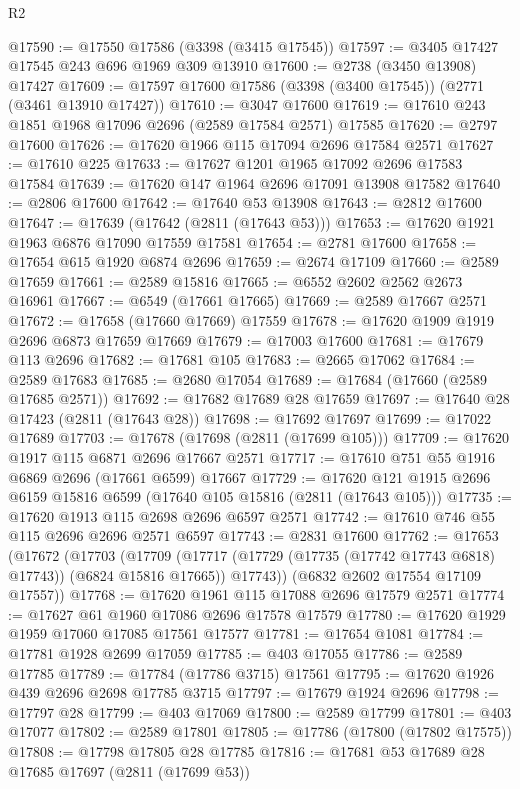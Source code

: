 \begin{lexlean}{R2}
\begin{coremodule}
@17590 := @17550 @17586 (@3398 (@3415 @17545))
@17597 := @3405 @17427 @17545 @243 @696 @1969 @309 @13910
@17600 := @2738 (@3450 @13908) @17427
@17609 := @17597 @17600 @17586 (@3398 (@3400 @17545)) (@2771 (@3461 @13910 @17427))
@17610 := @3047 @17600
@17619 := @17610 @243 @1851 @1968 @17096 @2696 (@2589 @17584 @2571) @17585
@17620 := @2797 @17600
@17626 := @17620 @1966 @115 @17094 @2696 @17584 @2571
@17627 := @17610 @225
@17633 := @17627 @1201 @1965 @17092 @2696 @17583 @17584
@17639 := @17620 @147 @1964 @2696 @17091 @13908 @17582
@17640 := @2806 @17600
@17642 := @17640 @53 @13908
@17643 := @2812 @17600
@17647 := @17639 (@17642 (@2811 (@17643 @53)))
@17653 := @17620 @1921 @1963 @6876 @17090 @17559 @17581
@17654 := @2781 @17600
@17658 := @17654 @615 @1920 @6874 @2696
@17659 := @2674 @17109
@17660 := @2589 @17659
@17661 := @2589 @15816
@17665 := @6552 @2602 @2562 @2673 @16961
@17667 := @6549 (@17661 @17665)
@17669 := @2589 @17667 @2571
@17672 := @17658 (@17660 @17669) @17559
@17678 := @17620 @1909 @1919 @2696 @6873 @17659 @17669
@17679 := @17003 @17600
@17681 := @17679 @113 @2696
@17682 := @17681 @105
@17683 := @2665 @17062
@17684 := @2589 @17683
@17685 := @2680 @17054
@17689 := @17684 (@17660 (@2589 @17685 @2571))
@17692 := @17682 @17689 @28 @17659
@17697 := @17640 @28 @17423 (@2811 (@17643 @28))
@17698 := @17692 @17697
@17699 := @17022 @17689
@17703 := @17678 (@17698 (@2811 (@17699 @105)))
@17709 := @17620 @1917 @115 @6871 @2696 @17667 @2571
@17717 := @17610 @751 @55 @1916 @6869 @2696 (@17661 @6599) @17667
@17729 := @17620 @121 @1915 @2696 @6159 @15816 @6599 (@17640 @105 @15816 (@2811 (@17643 @105)))
@17735 := @17620 @1913 @115 @2698 @2696 @6597 @2571
@17742 := @17610 @746 @55 @115 @2696 @2696 @2571 @6597
@17743 := @2831 @17600
@17762 := @17653
    (@17672
      (@17703
        (@17709
          (@17717 (@17729 (@17735 (@17742 @17743 @6818) @17743)) (@6824 @15816 @17665))
          @17743))
      (@6832 @2602 @17554 @17109 @17557))
@17768 := @17620 @1961 @115 @17088 @2696 @17579 @2571
@17774 := @17627 @61 @1960 @17086 @2696 @17578 @17579
@17780 := @17620 @1929 @1959 @17060 @17085 @17561 @17577
@17781 := @17654 @1081
@17784 := @17781 @1928 @2699 @17059
@17785 := @403 @17055
@17786 := @2589 @17785
@17789 := @17784 (@17786 @3715) @17561
@17795 := @17620 @1926 @439 @2696 @2698 @17785 @3715
@17797 := @17679 @1924 @2696
@17798 := @17797 @28
@17799 := @403 @17069
@17800 := @2589 @17799
@17801 := @403 @17077
@17802 := @2589 @17801
@17805 := @17786 (@17800 (@17802 @17575))
@17808 := @17798 @17805 @28 @17785
@17816 := @17681 @53 @17689 @28 @17685 @17697 (@2811 (@17699 @53))

\end{coremodule}
\end{lexlean}
